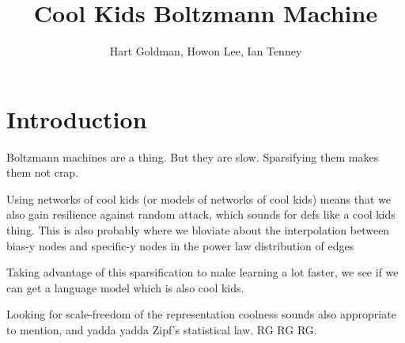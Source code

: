 \documentclass[12pt]{article}
\begin{document}
\title{Cool Kids Boltzmann Machine}
\author{Hart Goldman, Howon Lee, Ian Tenney}
\maketitle

\section{Introduction}
Boltzmann machines are a thing. But they are slow. Sparsifying them makes them not crap.

Using networks of cool kids (or models of networks of cool kids) means that we also gain resilience against random attack, which sounds for defs like a cool kids thing. This is also probably where we bloviate about the interpolation between bias-y nodes and specific-y nodes in the power law distribution of edges

Taking advantage of this sparsification to make learning a lot faster, we see if we can get a language model which is also cool kids.

Looking for scale-freedom of the representation coolness sounds also appropriate to mention, and yadda yadda Zipf's statistical law. RG RG RG.
\end{document}
